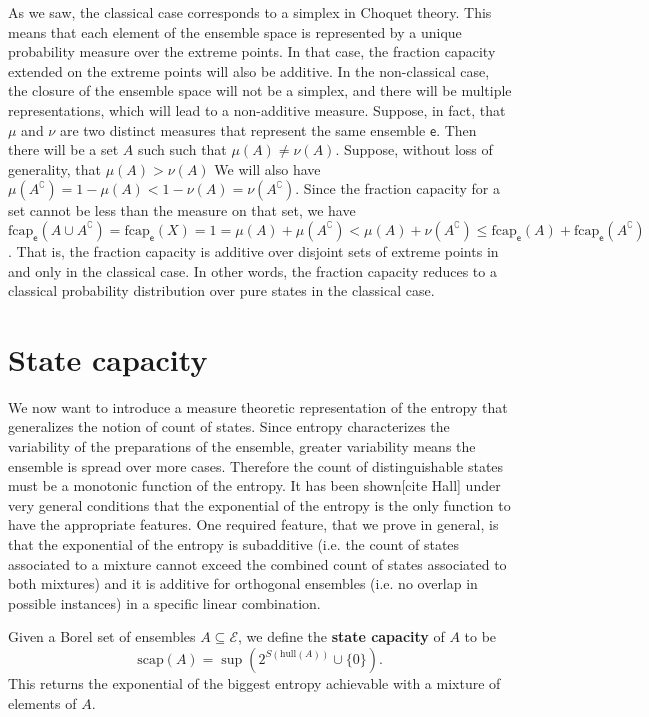 \documentclass[10pt,twocolumn, nofootinbib]{revtex4-2}
\newcommand\hull{\mathrm{hull}}
\newcommand\capacity{\mathrm{scap}}
\newcommand\frcap{\mathrm{fcap}}
\newcommand{\ens}[1][e] {\mathsf{#1}} %
\newcommand{\Ens}[1][E] {\mathcal{#1}} %
\begin{document}
As we saw, the classical case corresponds to a simplex in Choquet theory. This means that each element of the ensemble space is represented by a unique probability measure over the extreme points. In that case, the fraction capacity extended on the extreme points will also be additive. In the non-classical case, the closure of the ensemble space will not be a simplex, and there will be multiple representations, which will lead to a non-additive measure. Suppose, in fact, that $\mu$ and $\nu$ are two distinct measures that represent the same ensemble $\ens$. Then there will be a set $A$ such such that $\mu(A) \neq \nu(A)$. Suppose, without loss of generality, that $\mu(A) > \nu(A)$ We will also have $\mu(A^{\complement}) = 1- \mu(A) < 1 - \nu(A) = \nu(A^{\complement})$. Since the fraction capacity for a set cannot be less than the measure on that set, we have $\frcap_{\ens}(A \cup A^{\complement})=\frcap_{\ens}(X) = 1 = \mu(A) + \mu(A^{\complement}) < \mu(A) + \nu(A^{\complement}) \leq \frcap_{\ens}(A) + \frcap_{\ens}(A^{\complement})$. That is, the fraction capacity is additive over disjoint sets of extreme points in and only in the classical case. In other words, the fraction capacity reduces to a classical probability distribution over pure states in the classical case.

\section{State capacity}

We now want to introduce a measure theoretic representation of the entropy that generalizes the notion of count of states. Since entropy characterizes the variability of the preparations of the ensemble, greater variability means the ensemble is spread over more cases. Therefore the count of distinguishable states must be a monotonic function of the entropy. It has been shown[cite Hall] under very general conditions that the exponential of the entropy is the only function to have the appropriate features. One required feature, that we prove in general, is that the exponential of the entropy is subadditive (i.e. the count of states associated to a mixture cannot exceed the combined count of states associated to both mixtures) and it is additive for orthogonal ensembles (i.e. no overlap in possible instances) in a specific linear combination.

Given a Borel set of ensembles $A \subseteq \Ens$, we define the \textbf{state capacity} of $A$ to be
\begin{equation}
\capacity(A) = \sup(2^{S(\hull(A))}\cup\{0\}).
\end{equation}
This returns the exponential of the biggest entropy achievable with a mixture of elements of $A$.
\end{document}
